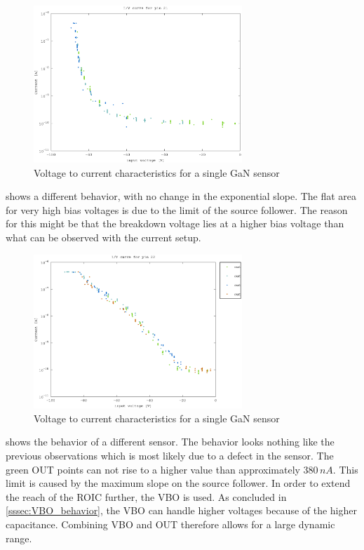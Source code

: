 \begin{figure}[H]
	    \centering
	    \includegraphics[width=0.7\textwidth]{fig/pin21_slope.eps}
	    \caption[]%
	    {Voltage to current characteristics for a single GaN sensor}    
	    \label{fig:pin21_slope}	
\end{figure}  

 shows a different behavior, with no change in the exponential slope. The flat area for very high bias voltages is due to the limit of the source follower. The reason for this might be that the breakdown voltage lies at a higher bias voltage than what can be observed with the current setup.

\begin{figure}[h]
	    \centering
	    \includegraphics[width=0.7\textwidth]{fig/pin22_slope.eps}
	    \caption[]%
	    {Voltage to current characteristics for a single GaN sensor}    
	    \label{fig:pin22_slope}	
\end{figure}  


 shows the behavior of a different sensor. The behavior looks nothing like the previous observations which is most likely due to a defect in the sensor. The green OUT points can not rise to a higher value than approximately $380\,nA$. This limit is caused by the maximum slope on the source follower. In order to extend the reach of the ROIC further, the VBO is used. As concluded in \cref{sssec:VBO_behavior}, the VBO can handle higher voltages because of the higher capacitance. Combining VBO and OUT therefore allows for a large dynamic range. 

